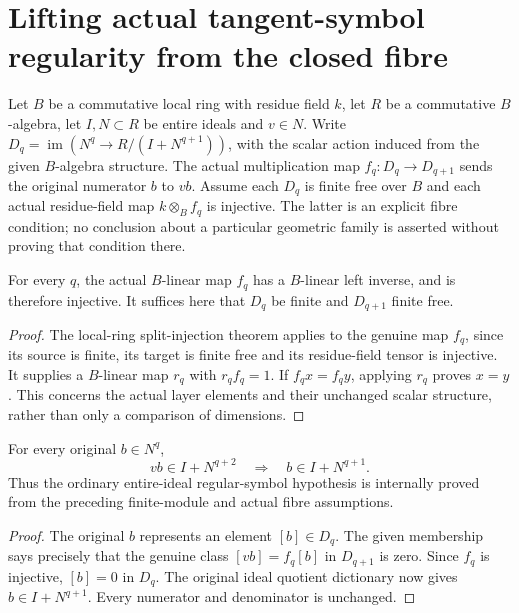 \section{Lifting actual tangent-symbol regularity from the closed fibre}

Let $B$ be a commutative local ring with residue field $k$, let $R$ be
a commutative $B$-algebra, let $I,N\subset R$ be entire ideals and
$v\in N$. Write $D_q=\operatorname{im}(N^q\to R/(I+N^{q+1}))$, with
the scalar action induced from the given $B$-algebra structure. The
actual multiplication map $f_q:D_q\to D_{q+1}$ sends the original
numerator $b$ to $vb$. Assume each $D_q$ is finite free over $B$ and
each actual residue-field map $k\otimes_B f_q$ is injective. The latter
is an explicit fibre condition; no conclusion about a particular
geometric family is asserted without proving that condition there.

\begin{theorem}
\label{hir:local-actual-symbol-map-splits}
\leanok
For every $q$, the actual $B$-linear map $f_q$ has a $B$-linear left
inverse, and is therefore injective. It suffices here that $D_q$ be
finite and $D_{q+1}$ finite free.
\end{theorem}
\begin{proof}
The local-ring split-injection theorem applies to the genuine map
$f_q$, since its source is finite, its target is finite free and its
residue-field tensor is injective. It supplies a $B$-linear map $r_q$
with $r_qf_q=1$. If $f_qx=f_qy$, applying $r_q$ proves $x=y$.
This concerns the actual layer elements and their unchanged scalar
structure, rather than only a comparison of dimensions.
\end{proof}

\begin{theorem}
\label{hir:local-actual-symbol-whole-regularity}
\leanok
For every original $b\in N^q$,
\[
 vb\in I+N^{q+2}\quad\Longrightarrow\quad b\in I+N^{q+1}.
\]
Thus the ordinary entire-ideal regular-symbol hypothesis is internally
proved from the preceding finite-module and actual fibre assumptions.
\end{theorem}
\begin{proof}
The original $b$ represents an element $[b]\in D_q$. The given
membership says precisely that the genuine class $[vb]=f_q[b]$ in
$D_{q+1}$ is zero. Since $f_q$ is injective, $[b]=0$ in $D_q$.
The original ideal quotient dictionary now gives
$b\in I+N^{q+1}$. Every numerator and denominator is unchanged.
\end{proof}

